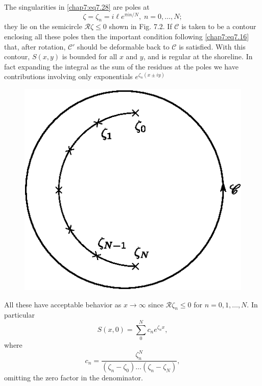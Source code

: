 The singularities in \eqref{chap7:eq7.28} are poles at 
$$
\zeta=\zeta_n=i\ell e^{\pi in/N},\;n=0,\ldots,N;
$$
they lie on the semicircle $\mathscr{R}\zeta\leq 0$ shown in Fig. 7.2. If $\mathscr{C}$ is taken to be a contour enclosing all these poles then the important condition following \eqref{chap7:eq7.16} that, after rotation, $\mathscr{C'}$ should be deformable back to $\mathscr{C}$ is satisfied. With this contour, $S(x,y)$ is bounded for all $x$ and $y$, and is regular at the shoreline. In fact expanding the integral as the sum of the residues at the poles we have contributions involving only exponentials $e^{\zeta_n(x\pm iy)}$ 
\begin{figure}[H]
\centering
\includegraphics{figures/fig61-7.2.eps}
\caption{}
\label{chap1:fig7.2}
\end{figure}

All these have acceptable behavior as $x\to\infty$ since $\mathscr{R}\zeta_n\leq 0$ for $n=0,1,\ldots,N$. In particular
\begin{equation}
S(x,0)=\sum\limits_0^N c_n e^{\zeta_n x},\tag{7.31}\label{chap7:eq7.31}
\end{equation}
where 
$$
c_n=\frac{\zeta_n^N}{\left(\zeta_n-\zeta_0\right)\ldots\left(\zeta_n-\zeta_N \right)},
$$\pageoriginale
omitting the zero factor in the denominator.

